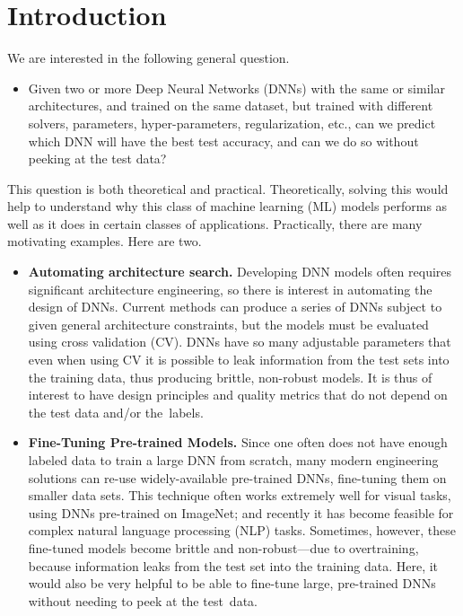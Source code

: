 
\section{Introduction}
\label{sxn:intro}

We are interested in the following general question.
\begin{itemize}
\item
Given two or more Deep Neural Networks (DNNs) with the same or similar architectures, and trained on the same dataset, but trained with different solvers, parameters, hyper-parameters, regularization, etc., can we predict which DNN will have the best test accuracy, and can we do so without peeking at the test data? 
\end{itemize}

This question is both theoretical and practical. 
Theoretically, solving this would help to understand why this class of machine learning (ML) models performs as well as it does in certain classes of applications.
Practically, there are many motivating examples.
% 
Here are two.
\begin{itemize}
\item
\textbf{Automating architecture search.}
Developing DNN models often requires significant architecture engineering, so there is interest in automating the design of DNNs.
Current methods can produce a series of DNNs subject to given general architecture constraints, but the models must be evaluated using cross validation (CV).
DNNs have so many adjustable parameters that even when using CV it is possible to leak information from the test sets into the training data, thus producing brittle, non-robust models.
It is thus of interest to have design principles and quality metrics that do not depend on the test data and/or the~labels. 
\item
\textbf{Fine-Tuning Pre-trained Models.}
Since one often does not have enough labeled data to train a large DNN from scratch, many modern engineering solutions can re-use widely-available pre-trained DNNs, fine-tuning them on smaller data sets. 
This technique often works extremely well for visual tasks, using DNNs pre-trained on ImageNet; and recently it has become feasible for complex natural language processing (NLP) tasks. 
Sometimes, however, these fine-tuned models become brittle and non-robust---due to overtraining, because information leaks from the test set into the training data.
Here, it would also be very helpful to be able to fine-tune large, pre-trained DNNs without needing to peek at the test~data.
\end{itemize}


